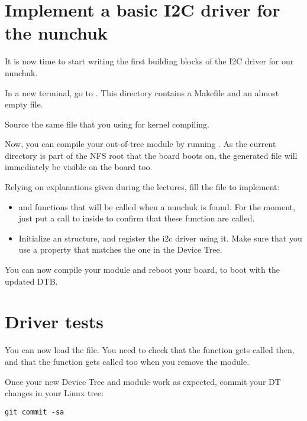 \section{Implement a basic I2C driver for the nunchuk}

It is now time to start writing the first building blocks of the I2C
driver for our nunchuk.

In a new terminal, go to .
This directory contains a Makefile and an almost empty 
file.

Source the same  file that you using for kernel compiling.

Now, you can compile your out-of-tree module by running . As
the current directory is part of the NFS root that the board boots on,
the generated  file will immediately be visible on the board
too.

Relying on explanations given during the lectures, fill the
 file to implement:

\begin{itemize}
\item {} and  functions that will
      be called when a nunchuk is found.
      For the moment, just put a call to  inside
      to confirm that these function are called.
\item Initialize an  structure, and register
      the i2c driver using it. Make sure that you use
      a  property that matches the one in the
      Device Tree.
\end{itemize}

You can now compile your module and reboot your board, to 
boot with the updated DTB.

\section{Driver tests}

You can now load the  file.
You need to check that the  function gets called
then, and that the  function gets called too
when you remove the module.

Once your new Device Tree and module work as expected, commit
your DT changes in your Linux tree:

\begin{verbatim}
git commit -sa 
\end{verbatim}
